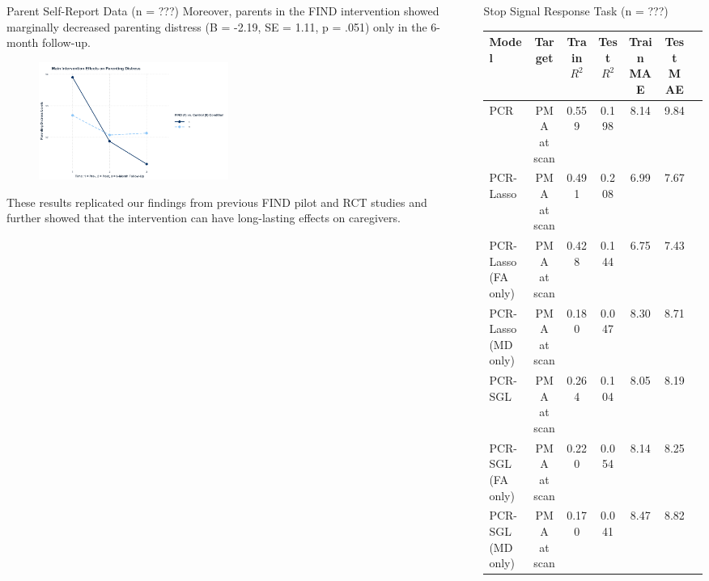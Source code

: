\documentclass[final]{beamer}
\newlength{\sepwidth}
\newlength{\colwidth}
\newcommand{\separatorcolumn}{\begin{column}{\sepwidth}\end{column}}
\begin{document}
\begin{frame}[t]
\begin{columns}[t]
\begin{column}{\colwidth}
\begin{block}{Parent Self-Report Data (n = ???)}
    Moreover, parents in the FIND intervention showed marginally decreased parenting distress (B = -2.19, SE = 1.11, p = .051) only in the 6-month follow-up. 
    
    \begin{figure}[ht]
        \centering
          \includegraphics[clip, width=0.5\textwidth]{distress.png}
          \label{fig:distress}
    \end{figure}
    
    These results replicated our findings from previous FIND pilot and RCT studies and further showed that the intervention can have long-lasting effects on caregivers.
    
  \end{block}
\end{column}

\separatorcolumn

\begin{column}{\colwidth}
  \begin{block}{Stop Signal Response Task (n = ???)}
    
    \begin{table}[ht]
      \centering
      \fontsize{9}{11}\selectfont
      \begin{tabularx}{\textwidth}{l c c c c c c}
        \toprule
        \textbf{Model} & \textbf{Target} & \textbf{Train $R^2$} & \textbf{Test $R^2$} & \textbf{Train MAE} &
        \textbf{Test MAE} \\
        \midrule
         PCR & PMA at scan & 0.559 & 0.198 & 8.14 & 9.84 \\
        \midrule
        \rowcolor{yellow!50} PCR-Lasso & PMA at scan & 0.491 & 0.208 & 6.99 & 7.67 \\
        PCR-Lasso (FA only) & PMA at scan & 0.428 & 0.144 & 6.75 & 7.43 \\
        PCR-Lasso (MD only) & PMA at scan & 0.180 & 0.047 & 8.30 & 8.71 \\
        \midrule
        \rowcolor{yellow!50} PCR-SGL & PMA at scan & 0.264 & 0.104 & 8.05 & 8.19 \\
        PCR-SGL (FA only) & PMA at scan & 0.220 & 0.054 & 8.14 & 8.25 \\
        PCR-SGL (MD only) & PMA at scan & 0.170 & 0.041 & 8.47 & 8.82 \\
        \bottomrule
      \end{tabularx}
    \end{table}
    

\end{block}
\end{column}
\end{columns}
\end{frame}
\end{document}
